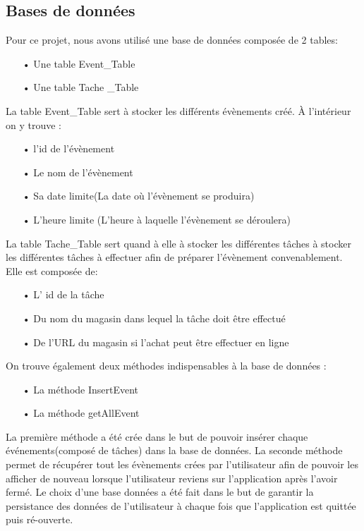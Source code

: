 \documentclass[12pt,a4paper]{report}
\begin{document}
\subsection{Bases de données}
\begin{flushleft}
\justify
Pour ce projet, nous avons utilisé une base de données composée de 2 tables:
\begin{itemize}
\item[•] Une table Event\_Table
\item[•] Une table Tache \_Table
\end{itemize}
\medskip
La table Event\_Table sert à stocker les différents évènements créé. À l'intérieur on y trouve :
\begin{itemize}
\item[•] l'id de l'évènement
\item[•] Le nom de l'évènement
\item[•] Sa date limite(La date où l'évènement se produira)
\item[•] L'heure limite (L'heure à laquelle l'évènement se déroulera)
\end{itemize}
\medskip 
La table Tache\_Table sert quand à elle à stocker les différentes tâches à stocker les différentes tâches à effectuer afin de préparer l'évènement convenablement. Elle est composée de:
\begin{itemize}
\item[•] L' id de la tâche
\item[•] Du nom du magasin dans lequel la tâche doit être effectué
\item[•] De l'URL du magasin si l'achat peut être effectuer en ligne 
\end{itemize}
\medskip 
On trouve également deux méthodes indispensables à la base de données :
\begin{itemize}
\item[•] La méthode InsertEvent
\item[•] La méthode getAllEvent
\end{itemize}
\medskip 
La première méthode a été crée dans le but de pouvoir insérer chaque événements(composé de tâches) dans la base de données. La seconde méthode permet de récupérer tout les évènements crées par l'utilisateur afin de pouvoir les afficher de nouveau lorsque l'utilisateur reviens sur l'application après l'avoir fermé.
Le choix d'une base données a été fait dans le but de garantir la persistance des données de l'utilisateur à chaque fois que l'application est quittée puis ré-ouverte.

\end{flushleft}
\end{document}
